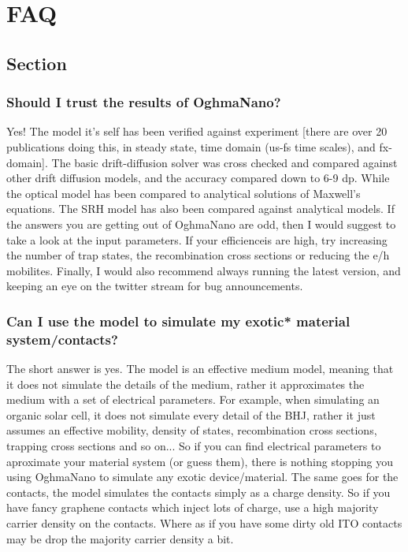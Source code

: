 
\chapter{FAQ}

\section{Section}
\subsection{Should I trust the results of OghmaNano?}
Yes!  The model it's self has been verified against experiment [there are over 20 publications doing this, in steady state, time domain (us-fs time scales), and fx-domain]. The basic drift-diffusion solver was cross checked and compared against other drift diffusion models, and the accuracy compared down to 6-9 dp.  While the optical model has been compared to analytical solutions of Maxwell's equations.  The SRH model has also been compared against analytical models.  If the answers you are getting out of OghmaNano are odd, then I would suggest to take a look at the input parameters.  If your efficienceis are high, try increasing the number of trap states, the recombination cross sections or reducing the e/h mobilites.  Finally, I would also recommend always running the latest version, and keeping an eye on the twitter stream for bug announcements.

\subsection{Can I use the model to simulate my exotic* material system/contacts?}
The short answer is yes.  The model is an effective medium model, meaning that it does not simulate the details of the medium, rather it approximates the medium with a set of electrical parameters.  For example, when simulating an organic solar cell, it does not simulate every detail of the BHJ, rather it just assumes an effective mobility, density of states, recombination cross sections, trapping cross sections and so on...  So if you can find electrical parameters to aproximate your material system (or guess them), there is nothing stopping you using OghmaNano to simulate any exotic device/material.  The same goes for the contacts, the model simulates the contacts simply as a charge density. So if you have fancy graphene contacts which inject lots of charge, use a high majority carrier density on the contacts.  Where as if you have some dirty old ITO contacts may be drop the majority carrier density a bit.

